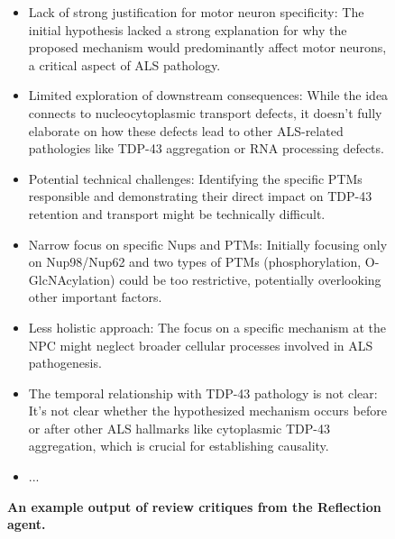 \begin{figure}[htbp!]
\begin{tcolorbox}[
    colback=black!5!white,
    colframe=black!60!white,
    title=\textbf{Example output of review critiques by the Reflection agent},
    fonttitle=\bfseries,
    arc=3mm,
    boxrule=1pt,
    bottomrule=2pt,
]
\footnotesize
\begin{itemize}
    \item Lack of strong justification for motor neuron specificity: The initial hypothesis lacked a strong explanation for why the proposed mechanism would predominantly affect motor neurons, a critical aspect of ALS pathology.
    \item Limited exploration of downstream consequences: While the idea connects to nucleocytoplasmic transport defects, it doesn't fully elaborate on how these defects lead to other ALS-related pathologies like TDP-43 aggregation or RNA processing defects.
    \item Potential technical challenges: Identifying the specific PTMs responsible and demonstrating their direct impact on TDP-43 retention and transport might be technically difficult.
    \item Narrow focus on specific Nups and PTMs: Initially focusing only on Nup98/Nup62 and two types of PTMs (phosphorylation, O-GlcNAcylation) could be too restrictive, potentially overlooking other important factors.
    \item Less holistic approach: The focus on a specific mechanism at the NPC might neglect broader cellular processes involved in ALS pathogenesis.
    \item The temporal relationship with TDP-43 pathology is not clear: It's not clear whether the hypothesized mechanism occurs before or after other ALS hallmarks like cytoplasmic TDP-43 aggregation, which is crucial for establishing causality.
    \item ...
\end{itemize}
\end{tcolorbox}
\vspace{0.1cm}
\caption{\textbf{An example output of review critiques from the Reflection agent.}}
\label{fig:ex_review_critiques}
\end{figure}

